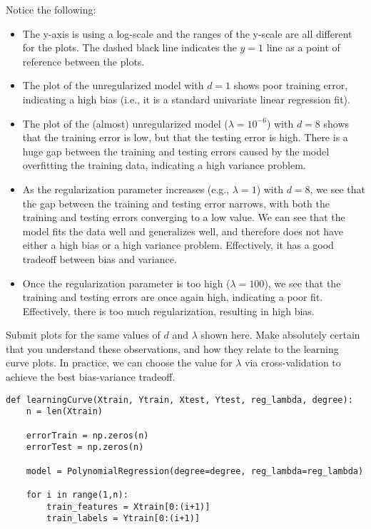 \documentclass{article}
\begin{document}
\begin{aprob}
    Notice the following:
    \begin{itemize}
        \item The y-axis is using a log-scale and the ranges of the y-scale are all different for the plots.  The dashed black line indicates the $y=1$ line as a point of reference between the plots.
        \item The plot of the unregularized model with $d = 1$ shows poor training error, indicating a high bias (i.e., it is a standard univariate linear regression fit).
        \item The plot of the (almost) unregularized model ($\lambda = 10^{-6}$) with $d = 8$ shows that the training error is low, but that the testing error is high.  There is a huge gap between the training and testing errors caused by the model overfitting the training data, indicating a high variance problem.
        \item As the regularization parameter increases (e.g., $\lambda = 1$) with $d = 8$, we see that the gap between the training and testing error narrows, with both the training and testing errors converging to a low value.  We can see that the model fits the data well and generalizes well, and therefore does not have either a high bias or a high variance problem.  Effectively, it has a good tradeoff between bias and variance.
        \item Once the regularization parameter is too high ($\lambda = 100$), we see that the training and testing errors are once again high, indicating a poor fit.  Effectively, there is too much regularization, resulting in high bias.
    \end{itemize}
    
    Submit plots for the same values of $d$ and $\lambda$ shown here. Make absolutely certain that you understand these observations, and how they relate to the learning curve plots.  In practice, we can choose the value for $\lambda$ via cross-validation to achieve the best bias-variance tradeoff.
    
    \begin{lstlisting}
def learningCurve(Xtrain, Ytrain, Xtest, Ytest, reg_lambda, degree):
    n = len(Xtrain)

    errorTrain = np.zeros(n)
    errorTest = np.zeros(n)

    model = PolynomialRegression(degree=degree, reg_lambda=reg_lambda)

    for i in range(1,n):
        train_features = Xtrain[0:(i+1)]
        train_labels = Ytrain[0:(i+1)]
        

\end{lstlisting}
\end{aprob}
\end{document}
